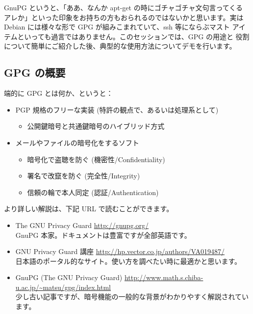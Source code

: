 \documentclass[mingoth,a4paper]{jsarticle}
\begin{document}

GnuPG というと、「ああ、なんか apt-get の時にゴチャゴチャ文句言ってくる
アレか」といった印象をお持ちの方もおられるのではないかと思います。実は
Debian には様々な形で GPG が組みこまれていて、ssh 等にならぶマスト
アイテムといっても過言ではありません。このセッションでは、GPG の用途と
役割について簡単にご紹介した後、典型的な使用方法についてデモを行います。

\subsection{GPG の概要}

端的に GPG とは何か、というと：
\begin{itemize}
 \item PGP 規格のフリーな実装 (特許の観点で、あるいは処理系として)
       \begin{itemize}
        \item 公開鍵暗号と共通鍵暗号のハイブリッド方式
       \end{itemize}
 \item メールやファイルの暗号化をするソフト
       \begin{itemize}
        \item 暗号化で盗聴を防ぐ (機密性/Confidentiality)
        \item 署名で改竄を防ぐ (完全性/Integrity)
        \item 信頼の輪で本人同定 (認証/Authentication)
       \end{itemize}
\end{itemize}

より詳しい解説は、下記 URL で読むことができます。

\begin{itemize}
 \item The GNU Privacy Guard \url{http://gnupg.org/} \\
       GnuPG 本家。ドキュメントは豊富ですが全部英語です。
 \item GNU Privacy Guard 講座 \url{http://hp.vector.co.jp/authors/VA019487/} \\
       日本語のポータル的なサイト。使い方を調べたい時に最適かと思います。       
 \item GnuPG (The GNU Privacy Guard) \url{http://www.math.s.chiba-u.ac.jp/~matsu/gpg/index.html} \\
       少し古い記事ですが、暗号機能の一般的な背景がわかりやすく解説されています。
\end{itemize}
\end{document}
